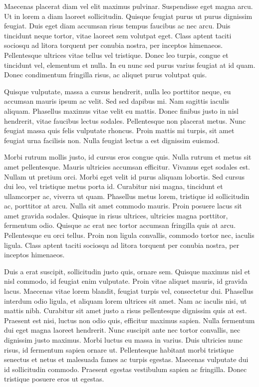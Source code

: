 \documentclass{homework}
\begin{document}
Maecenas placerat diam vel elit maximus pulvinar. Suspendisse eget magna arcu. Ut in lorem a diam laoreet sollicitudin. Quisque feugiat purus ut purus dignissim feugiat. Duis eget diam accumsan risus tempus faucibus ac nec arcu. Duis tincidunt neque tortor, vitae laoreet sem volutpat eget. Class aptent taciti sociosqu ad litora torquent per conubia nostra, per inceptos himenaeos. Pellentesque ultrices vitae tellus vel tristique. Donec leo turpis, congue et tincidunt vel, elementum et nulla. In eu nunc sed purus varius feugiat at id quam. Donec condimentum fringilla risus, ac aliquet purus volutpat quis.

Quisque vulputate, massa a cursus hendrerit, nulla leo porttitor neque, eu accumsan mauris ipsum ac velit. Sed sed dapibus mi. Nam sagittis iaculis aliquam. Phasellus maximus vitae velit eu mattis. Donec finibus justo in nisl hendrerit, vitae faucibus lectus sodales. Pellentesque non placerat metus. Nunc feugiat massa quis felis vulputate rhoncus. Proin mattis mi turpis, sit amet feugiat urna facilisis non. Nulla feugiat lectus a est dignissim euismod.

Morbi rutrum mollis justo, id cursus eros congue quis. Nulla rutrum et metus sit amet pellentesque. Mauris ultricies accumsan efficitur. Vivamus eget sodales est. Nullam ut pretium orci. Morbi eget velit id purus aliquam lobortis. Sed cursus dui leo, vel tristique metus porta id. Curabitur nisi magna, tincidunt et ullamcorper ac, viverra ut quam. Phasellus metus lorem, tristique id sollicitudin ac, porttitor at arcu. Nulla sit amet commodo mauris. Proin posuere lacus sit amet gravida sodales. Quisque in risus ultrices, ultricies magna porttitor, fermentum odio. Quisque ac erat nec tortor accumsan fringilla quis at arcu. Pellentesque eu orci tellus. Proin non ligula convallis, commodo tortor nec, iaculis ligula. Class aptent taciti sociosqu ad litora torquent per conubia nostra, per inceptos himenaeos.

Duis a erat suscipit, sollicitudin justo quis, ornare sem. Quisque maximus nisl et nisl commodo, id feugiat enim vulputate. Proin vitae aliquet mauris, id gravida lacus. Maecenas vitae lorem blandit, feugiat turpis vel, consectetur dui. Phasellus interdum odio ligula, et aliquam lorem ultrices sit amet. Nam ac iaculis nisi, ut mattis nibh. Curabitur sit amet justo a risus pellentesque dignissim quis at est. Praesent est nisi, luctus non odio quis, efficitur maximus sapien. Nulla fermentum dui eget magna laoreet hendrerit. Nunc suscipit ante nec tortor convallis, nec dignissim justo maximus. Morbi luctus eu massa in varius. Duis ultricies nunc risus, id fermentum sapien ornare ut. Pellentesque habitant morbi tristique senectus et netus et malesuada fames ac turpis egestas. Maecenas vulputate dui id sollicitudin commodo. Praesent egestas vestibulum sapien ac fringilla. Donec tristique posuere eros ut egestas.
\end{document}
